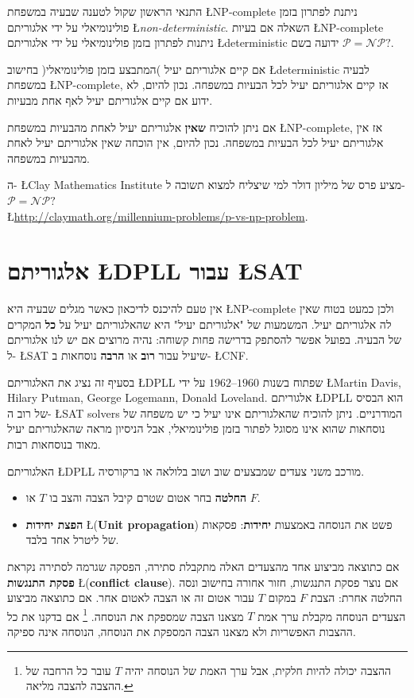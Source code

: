 \documentclass[12pt,a4paper]{article}
\begin{document}
התנאי הראשון שקול לטענה שבעיה במשפחת
\L{NP-complete}
ניתנת לפתרון בזמן פולינומיאלי על ידי אלגוריתם
\L{\emph{non-deterministic}}.
השאלה אם בעיות 
\L{NP-complete}
ניתנות לפתרון בזמן פולינומיאלי על ידי אלגוריתם
\L{deterministic}
ידועה בשם
$\mathcal{P}=\mathcal{NP}?$.

אם קיים אלגוריתם יעיל )המתבצע בזמן פולינומיאלי( בחישוב
\L{deterministic}
לבעיה במשפחת
\L{NP-complete},
אז קיים אלגוריתם יעיל לכל הבעיות במשפחה. נכון להיום, לא ידוע אם קיים אלגוריתם יעיל לאף אחת מבעיות.

אם ניתן להוכיח 
\textbf{שאין}
אלגוריתם יעיל לאחת מהבעיות במשפחת
\L{NP-complete},
אז אין אלגוריתם יעיל לכל הבעיות במשפחה. נכון להיום, אין הוכחה שאין אלגוריתם יעיל לאחת מהבעיות במשפחה.

ה-%
\L{Clay Mathematics Institute}
מציע פרס של מיליון דולר למי שיצליח למצוא תשובה ל-%
$\mathcal{P}=\mathcal{NP}?$\\
\L{\url{http://claymath.org/millennium-problems/p-vs-np-problem}}.

\section{אלגוריתם \L{DPLL} עבור \L{SAT}}

אין טעם להיכנס לדיכאון כאשר מגלים שבעיה היא 
\L{NP-complete}
ולכן כמעט בטוח שאין לה אלגוריתם יעיל. המשמעות של "אלגוריתם יעיל" היא שהאלגוריתם יעיל על
\textbf{כל}
המקרים של הבעיה. בפועל אפשר להסתפק בדרישה פחות קשוחה: נהיה מרוצים אם יש לנו אלגוריתם ל-%
\L{SAT}
שיעיל עבור 
\textbf{רוב}
או
\textbf{הרבה}
נוסחאות ב-%
\L{CNF}. 

בסעיף זה נציג את האלגוריתם
\L{DPLL}
שפתוח בשנות 
$1960$--$1962$
על ידי
\L{Martin Davis, Hilary Putman, George Logemann, Donald Loveland}.
אלגוריתם
\L{DPLL}
הוא הבסיס של רוב ה-%
\L{SAT solvers}
המודרניים. ניתן להוכיח שהאלגוריתם אינו יעיל כי יש משפחה של נוסחאות שהוא אינו מסוגל לפתור בזמן פולינומיאלי, אבל הניסיון מראה שהאלגוריתם יעיל מאוד בנוסחאות רבות.

האלגוריתם
\L{DPLL}
מורכב משני צעדים שמבצעים שוב ושוב בלולאה או ברקורסיה.
\begin{itemize}
\item \textbf{החלטה}
בחר אטום שטרם קיבל הצבה והצב בו 
$T$
או
$F$.
\item 
\textbf{הפצת יחידות} 
\L{(\textbf{Unit propagation})} 
פשט את הנוסחה באמצעות
\textbf{יחידות}:
פסקאות של ליטרל אחד בלבד.
\end{itemize}
אם כתוצאה מביצוע אחד מהצעדים האלה מתקבלת סתירה, הפסקה שגרמה לסתירה נקראת
\textbf{פסקת התנגשות}
\L{(\textbf{conflict clause})}.
אם נוצר פסקת התנגשות, חזור אחורה בחישוב ונסה החלטה אחרת: הצבת
$F$
במקום
$T$
עבור אטום זה או הצבה לאטום אחר. אם כתוצאה מביצוע הצעדים הנוסחה מקבלת ערך אמת
$T$
מצאנו הצבה שמספקת את הנוסחה.%
\footnote{%
ההצבה יכולה להיות חלקית, אבל ערך האמת של הנוסחה יהיה 
$T$
עובר כל הרחבה של ההצבה להצבה מליאה.%
}
אם בדקנו את כל ההצבות האפשריות ולא מצאנו הצבה המספקת את הנוסחה, הנוסחה אינה ספיקה.
\end{document}
